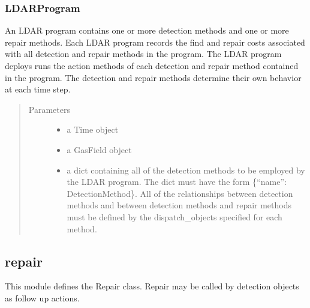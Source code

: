 \documentclass[letterpaper,10pt,english]{sphinxmanual}
\begin{document}
\subsubsection{LDARProgram}
\label{\detokenize{index:ldarprogram}}

\begin{fulllineitems}
\label{\detokenize{index:feast.DetectionModules.ldar_program.LDARProgram}}
An LDAR program contains one or more detection methods and one or more repair methods. Each LDAR program records
the find and repair costs associated with all detection and repair methods in the program. The LDAR program
deploys runs the action methods of each detection and repair method contained in the program. The detection and
repair methods determine their own behavior at each time step.
\begin{quote}\begin{description}
\item[{Parameters}] \leavevmode\begin{itemize}
\item {} 
 \textendash{} a Time object

\item {} 
 \textendash{} a GasField object

\item {} 
 \textendash{} a dict containing all of the detection methods to be employed by the LDAR program. The dict
must have the form \{“name”: DetectionMethod\}. All of the relationships between detection methods and between
detection methods and repair methods must be defined by the dispatch\_objects specified for each method.

\end{itemize}

\end{description}\end{quote}

\end{fulllineitems}



\subsection{repair}
\label{\detokenize{index:module-feast.DetectionModules.repair}}\label{\detokenize{index:repair}}
This module defines the Repair class. Repair may be called by detection objects as follow up actions.
\end{document}
